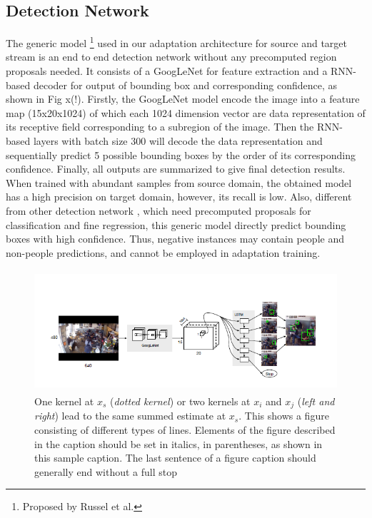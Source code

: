 \documentclass[runningheads]{llncs}
\begin{document}
\subsection{Detection Network}
\label{section:Detection Network}
The generic model \footnote{Proposed by Russel et al.} used in our adaptation architecture for source and target stream is an end to end detection network without any precomputed region proposals needed. It consists of a GoogLeNet \cite{szegedy2015going} for feature extraction and a RNN-based decoder for output of bounding box and corresponding confidence, as shown in Fig x(!). Firstly, the GoogLeNet model encode the image into a feature map (15x20x1024) of which each 1024 dimension vector are data representation of its receptive field corresponding to a subregion of the image. Then the RNN-based layers with batch size 300 will decode the data representation and sequentially predict 5 possible bounding boxes by the order of its corresponding confidence. Finally, all outputs are summarized to give final detection results. When trained with abundant samples from source domain, the obtained model has a high precision on target domain, however, its recall is low. Also, different from other detection network \cite{girshick2015fast,vu2015context}, which need precomputed proposals for classification and fine regression, this generic model directly predict bounding boxes with high confidence. Thus, negative instances may contain people and non-people predictions, and cannot be employed in adaptation training.

\begin{figure}
\centering
\includegraphics[height=4.5cm]{images/dummyimage.png}
\caption{One kernel at $x_s$ ({\it dotted kernel}) or two kernels at
$x_i$ and $x_j$ ({\it left and right}) lead to the same summed estimate
at $x_s$. This shows a figure consisting of different types of
lines. Elements of the figure described in the caption should be set in
italics,
in parentheses, as shown in this sample caption. The last
sentence of a figure caption should generally end without a full stop}
\label{fig:example}
\end{figure}
\end{document}
